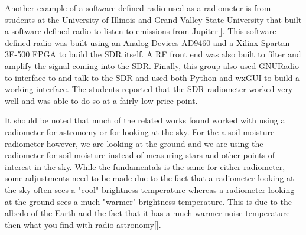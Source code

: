 Another example of a software defined radio used as a radiometer is from students at the University of Illinois and Grand Valley State University that built a software defined radio to listen to emissions from Jupiter[\cite{Behnke}].  This software defined radio was built using an Analog Devices AD9460 and a Xilinx Spartan-3E-500 FPGA to build the SDR itself.  A RF front end was also built to filter and amplify the signal coming into the SDR.  Finally, this group also used GNURadio to interface to and talk to the SDR and used both Python and wxGUI to build a working interface.  The students reported that the SDR radiometer worked very well and was able to do so at a fairly low price point.

It should be noted that much of the related works found worked with using a radiometer for astronomy or for looking at the sky.  For the a soil moisture radiometer however, we are looking at the ground and we are using the radiometer for soil moisture instead of measuring stars and other points of interest in the sky.  While the fundamentals is the same for either radiometer, some adjustments need to be made due to the fact that a radiometer looking at the sky often sees a "cool" brightness temperature whereas a radiometer looking at the ground sees a much "warmer" brightness temperature.  This is due to the albedo of the Earth and the fact that it has a much warmer noise temperature then what you find with radio astronomy[\cite{Tiuri}].

